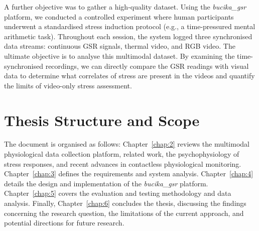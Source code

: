 \documentclass[11pt,a4paper]{report}
\begin{document}
A further objective was to gather a high-quality dataset. Using the \textit{bucika\_gsr} platform, we conducted a controlled experiment where human participants underwent a standardised stress induction protocol (e.g., a time-pressured mental arithmetic task). Throughout each session, the system logged three synchronised data streams: continuous GSR signals, thermal video, and RGB video. The ultimate objective is to analyse this multimodal dataset. By examining the time-synchronised recordings, we can directly compare the GSR readings with visual data to determine what correlates of stress are present in the videos and quantify the limits of video-only stress assessment.

\section{Thesis Structure and Scope}

The document is organised as follows: Chapter~\ref{chap:2} reviews the multimodal physiological data collection platform, related work, the psychophysiology of stress responses, and recent advances in contactless physiological monitoring. Chapter~\ref{chap:3} defines the requirements and system analysis. Chapter~\ref{chap:4} details the design and implementation of the \textit{bucika\_gsr} platform. Chapter~\ref{chap:5} covers the evaluation and testing methodology and data analysis. Finally, Chapter~\ref{chap:6} concludes the thesis, discussing the findings concerning the research question, the limitations of the current approach, and potential directions for future research.



\end{document}
